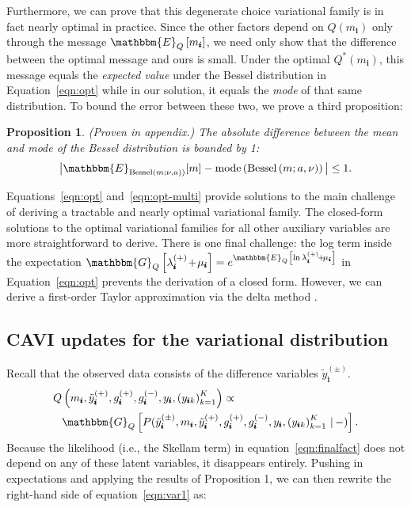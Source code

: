 \documentclass{article}
\newcommand{\subs}{\pmb{i}}
\newcommand{\wsup}[2]{#1_{\subs}^{(#2)}}
\newcommand{\ytP}{\wsup{\tilde{y}}{+}}
\newcommand{\ytPM}{\wsup{\tilde{y}}{\pm}}
\newcommand{\ysk}{y_{\subs k}}
\newcommand{\ys}{y_{\subs}}
\newcommand{\lamP}{\wsup{\lambda}{+}}
\newcommand{\gP}{\wsup{g}{+}}
\newcommand{\gM}{\wsup{g}{-}}
\newcommand{\mus}{\mu_{\subs}}
\newcommand{\ms}{m_{\subs}}
\newcommand{\Bess}[1]{\textup{Bessel}\left( #1 \right)}
\newcommand{\Eq}[1]{\mathbbm{E}_Q\left[#1\right]}
\newcommand{\Gq}[1]{\mathbbm{G}_Q\left[#1\right]}
\newcommand{\tp}{\!+\!}
\newtheorem{proposition}{Proposition}
\begin{document}
  Furthermore, we can prove that this degenerate choice variational family is in
  fact nearly optimal in practice. Since the other factors depend on $Q(\ms)$
  only through the message $\Eq{\ms}$, we need only show that the difference
  between the optimal message and ours is small. Under the optimal $Q^*(\ms)$,
  this message equals the \emph{expected value} under the Bessel distribution in
  Equation~\ref{eqn:opt} while in our solution, it equals the \emph{mode} of
  that same distribution. To bound the error between these two, we prove a
  third proposition:
  
  \begin{proposition} (Proven in appendix.) The absolute
  difference between the mean and mode of the Bessel distribution is bounded by
  1:
    \[ \big| \mathbbm{E}_{\Bess{m; \nu, a})}[m]  - \textup{mode} \left(\Bess{m;
    a, \nu} \right) \big|  \leq 1. \]
  \end{proposition}
  
  Equations~\ref{eqn:opt} and~\ref{eqn:opt-multi} provide solutions to the main
  challenge of deriving a tractable and nearly optimal variational family. The
  closed-form solutions to the optimal variational families for all other
  auxiliary variables are more straightforward to derive.
  There is one final
  challenge: the log term inside the expectation $\Gq{\lamP \tp \mus} =
  e^{\Eq{\ln \lamP \tp \mus}}$ in Equation~\ref{eqn:opt} prevents the derivation
  of a closed form. However, we can derive a first-order Taylor approximation
  via the delta method \citep{ver2012invented}.
  
  \subsection{CAVI updates for the variational distribution}
  \label{sec:cavi}
  Recall that the observed data consists of the difference variables $\ytPM$.
  \begin{align}
    \label{eqn:var1}
  Q& \left( \ms, \ytP, \gP, \gM, \ys, \left(\ysk\right)_{k=1}^K\right) \propto \notag\\
  & \Gq{P(\ytPM, \ms, \ytP, \gP, \gM, \ys, \left(\ysk\right)_{k=1}^K \,|\,-)}.
  \end{align}
  Because the likelihood (i.e., the Skellam term) in
  equation~\ref{eqn:finalfact} does not depend on any of these latent variables,
  it disappears entirely. Pushing in expectations and applying the results of Proposition
  1, we can then rewrite the right-hand side of
  equation~\ref{eqn:var1} as:
    
\end{document}
